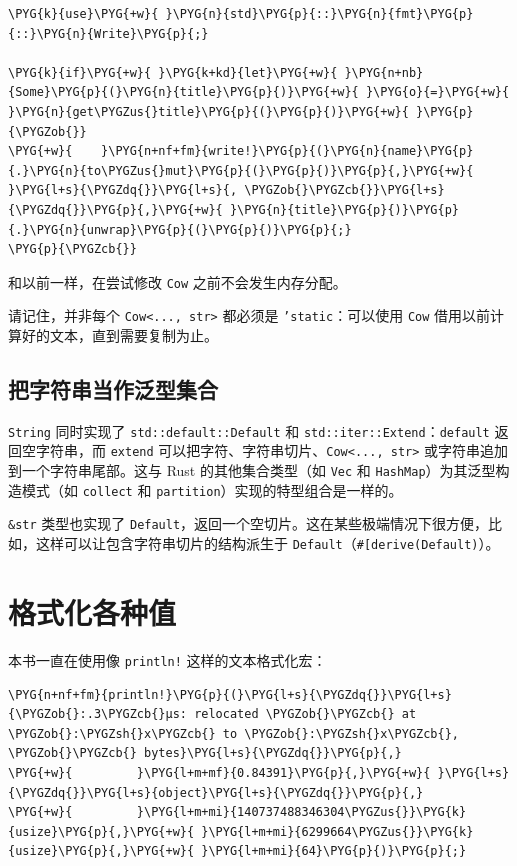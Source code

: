 \begin{Verbatim}[commandchars=\\\{\},breaklines=true,breakanywhere=true,fontsize=\codefont,xleftmargin=17bp]
\PYG{k}{use}\PYG{+w}{ }\PYG{n}{std}\PYG{p}{::}\PYG{n}{fmt}\PYG{p}{::}\PYG{n}{Write}\PYG{p}{;}

\PYG{k}{if}\PYG{+w}{ }\PYG{k+kd}{let}\PYG{+w}{ }\PYG{n+nb}{Some}\PYG{p}{(}\PYG{n}{title}\PYG{p}{)}\PYG{+w}{ }\PYG{o}{=}\PYG{+w}{ }\PYG{n}{get\PYGZus{}title}\PYG{p}{(}\PYG{p}{)}\PYG{+w}{ }\PYG{p}{\PYGZob{}}
\PYG{+w}{    }\PYG{n+nf+fm}{write!}\PYG{p}{(}\PYG{n}{name}\PYG{p}{.}\PYG{n}{to\PYGZus{}mut}\PYG{p}{(}\PYG{p}{)}\PYG{p}{,}\PYG{+w}{ }\PYG{l+s}{\PYGZdq{}}\PYG{l+s}{, \PYGZob{}\PYGZcb{}}\PYG{l+s}{\PYGZdq{}}\PYG{p}{,}\PYG{+w}{ }\PYG{n}{title}\PYG{p}{)}\PYG{p}{.}\PYG{n}{unwrap}\PYG{p}{(}\PYG{p}{)}\PYG{p}{;}
\PYG{p}{\PYGZcb{}}
\end{Verbatim}

和以前一样，在尝试修改 \texttt{Cow} 之前不会发生内存分配。

请记住，并非每个 \texttt{Cow<..., str>} 都必须是 \texttt{'static}：可以使用 \texttt{Cow} 借用以前计算好的文本，直到需要复制为止。

\subsection{把字符串当作泛型集合}

\texttt{String} 同时实现了 \texttt{std::default::Default} 和 \texttt{std::iter::Extend}：\texttt{default} 返回空字符串，而 \texttt{extend} 可以把字符、字符串切片、\texttt{Cow<..., str>} 或字符串追加到一个字符串尾部。这与 Rust 的其他集合类型（如 \texttt{Vec} 和 \texttt{HashMap}）为其泛型构造模式（如 \texttt{collect} 和 \texttt{partition}）实现的特型组合是一样的。

\texttt{\&str} 类型也实现了 \texttt{Default}，返回一个空切片。这在某些极端情况下很方便，比如，这样可以让包含字符串切片的结构派生于 \texttt{Default}（\texttt{\#[derive(Default)}）。

\section{格式化各种值}

本书一直在使用像 \texttt{println!} 这样的文本格式化宏：

\begin{Verbatim}[commandchars=\\\{\},breaklines=true,breakanywhere=true,fontsize=\codefont,xleftmargin=17bp]
\PYG{n+nf+fm}{println!}\PYG{p}{(}\PYG{l+s}{\PYGZdq{}}\PYG{l+s}{\PYGZob{}:.3\PYGZcb{}μs: relocated \PYGZob{}\PYGZcb{} at \PYGZob{}:\PYGZsh{}x\PYGZcb{} to \PYGZob{}:\PYGZsh{}x\PYGZcb{}, \PYGZob{}\PYGZcb{} bytes}\PYG{l+s}{\PYGZdq{}}\PYG{p}{,}
\PYG{+w}{         }\PYG{l+m+mf}{0.84391}\PYG{p}{,}\PYG{+w}{ }\PYG{l+s}{\PYGZdq{}}\PYG{l+s}{object}\PYG{l+s}{\PYGZdq{}}\PYG{p}{,}
\PYG{+w}{         }\PYG{l+m+mi}{140737488346304\PYGZus{}}\PYG{k}{usize}\PYG{p}{,}\PYG{+w}{ }\PYG{l+m+mi}{6299664\PYGZus{}}\PYG{k}{usize}\PYG{p}{,}\PYG{+w}{ }\PYG{l+m+mi}{64}\PYG{p}{)}\PYG{p}{;}
\end{Verbatim}

